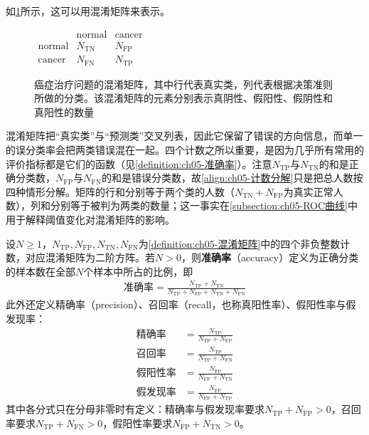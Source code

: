 \documentclass[../../main.tex]{subfiles}
\begin{document}
如\cref{figure:ch05-混淆矩阵}所示，这可以用混淆矩阵来表示。

\begin{figure}[htbp]
  \centering
  $\begin{array}{c|cc}
    & \text{normal} & \text{cancer}\\\hline
    \text{normal} & N_{\mathrm{TN}} & N_{\mathrm{FP}}\\
    \text{cancer} & N_{\mathrm{FN}} & N_{\mathrm{TP}}
  \end{array}$
  \caption{癌症治疗问题的混淆矩阵，其中行代表真实类，列代表根据决策准则所做的分类。该混淆矩阵的元素分别表示真阴性、假阳性、假阴性和真阳性的数量}
  \label{figure:ch05-混淆矩阵}
\end{figure}

\begin{remark}
混淆矩阵把“真实类”与“预测类”交叉列表，因此它保留了错误的方向信息，而单一的误分类率会把两类错误混在一起。四个计数之所以重要，是因为几乎所有常用的评价指标都是它们的函数（见\cref{definition:ch05-准确率}）。注意$N_{\mathrm{TP}}$与$N_{\mathrm{TN}}$的和是正确分类数，$N_{\mathrm{FP}}$与$N_{\mathrm{FN}}$的和是错误分类数，故\eqref{align:ch05-计数分解}只是把总人数按四种情形分解。矩阵的行和分别等于两个类的人数（$N_{\mathrm{TN}}+N_{\mathrm{FP}}$为真实正常人数），列和分别等于被判为两类的数量；这一事实在\cref{subsection:ch05-ROC曲线}中用于解释阈值变化对混淆矩阵的影响。
\end{remark}

\begin{definition}\label{definition:ch05-准确率}
设$N\geqslant1$，$N_{\mathrm{TP}},N_{\mathrm{FP}},N_{\mathrm{TN}},N_{\mathrm{FN}}$为\cref{definition:ch05-混淆矩阵}中的四个非负整数计数，对应混淆矩阵为二阶方阵。若$N>0$，则\textbf{准确率}（accuracy）定义为正确分类的样本数在全部$N$个样本中所占的比例，即
\begin{align}
  \text{准确率}=\frac{N_{\mathrm{TP}}+N_{\mathrm{TN}}}{N_{\mathrm{TP}}+N_{\mathrm{FP}}+N_{\mathrm{TN}}+N_{\mathrm{FN}}}
  \label{align:ch05-准确率}
\end{align}
此外还定义精确率（precision）、召回率（recall，也称真阳性率）、假阳性率与假发现率：
\begin{align}
  \text{精确率}&=\frac{N_{\mathrm{TP}}}{N_{\mathrm{TP}}+N_{\mathrm{FP}}}
  \label{align:ch05-精确率}\\
  \text{召回率}&=\frac{N_{\mathrm{TP}}}{N_{\mathrm{TP}}+N_{\mathrm{FN}}}
  \label{align:ch05-召回率}\\
  \text{假阳性率}&=\frac{N_{\mathrm{FP}}}{N_{\mathrm{FP}}+N_{\mathrm{TN}}}
  \label{align:ch05-假阳性率}\\
  \text{假发现率}&=\frac{N_{\mathrm{FP}}}{N_{\mathrm{FP}}+N_{\mathrm{TP}}}
  \label{align:ch05-假发现率}
\end{align}
其中各分式只在分母非零时有定义：精确率与假发现率要求$N_{\mathrm{TP}}+N_{\mathrm{FP}}>0$，召回率要求$N_{\mathrm{TP}}+N_{\mathrm{FN}}>0$，假阳性率要求$N_{\mathrm{FP}}+N_{\mathrm{TN}}>0$。
\end{definition}
\end{document}
